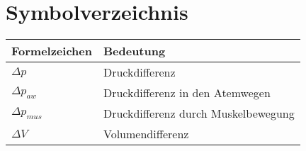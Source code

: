 
\chapter{Symbolverzeichnis}

%

 \begin{longtable}{p{}p{}}

\toprule
{\textbf{Formelzeichen}}							&
{\textbf{Bedeutung}} \\
\midrule
$\Delta p$                      & Druckdifferenz\\
$\Delta p_{aw}$                 & Druckdifferenz in den Atemwegen\\
$\Delta p_{mus}$                & Druckdifferenz durch Muskelbewegung\\
$\Delta V$                      & Volumendifferenz\\



\bottomrule

\end{longtable}

